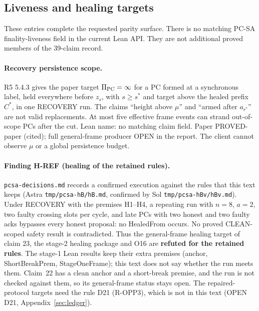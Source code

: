 \documentclass{article}
\newcommand{\nm}[1]{\nolinkurl{#1}}
\begin{document}
\subsection{Liveness and healing targets}

These entries complete the requested parity surface. There is no matching
PC-SA finality-liveness field in the current Lean API. They are not
additional proved members of the 39-claim record.

\paragraph{Recovery persistence scope.}
R5 5.4.3 gives the paper target $\Pi_{\rm PC}=\infty$ for a PC formed at
a synchronous label, held everywhere before $z_s$, with $s\geq s^*$ and
target above the healed prefix $C^*$, in one RECOVERY run.
The claims ``height above $\mu$'' and ``armed after $a_{r^*}$'' are not
valid replacements. At most five effective frame events can strand
out-of-scope PCs after the cut. Lean name: no matching claim field.
Paper PROVED-paper (cited); full general-frame producer OPEN in the report.
The client cannot observe $\mu$ or a global persistence budget.

\paragraph{Finding H-REF (healing of the retained rules).}
\nm{pcsa-decisions.md} records a confirmed execution against the rules
that this text keeps (Astra \nm{tmp/pcsa-hB/hB.md}, confirmed by Sol
\nm{tmp/pcsa-hBv/hBv.md}).  Under RECOVERY with the premises H1--H4, a
repeating run with $n=8$, $a=2$, two faulty crossing slots per cycle, and
late PCs with two honest and two faulty acks bypasses every honest
proposal: no HealedFrom occurs.  No proved CLEAN-scoped safety result is
contradicted.  Thus the general-frame healing target of claim 23,
the stage-2 healing package and O16 are \textbf{refuted for the retained
rules}.  The stage-1 Lean results keep their extra premises (anchor,
ShortBreakPrem, StageOneFrame); this text does not say whether the run meets
them.  Claim~22 has a clean anchor and a short-break premise, and the run
is not checked against them, so its general-frame status stays open.  The repaired-protocol targets need the rule D21 (R-OPP3), which is
not in this text (OPEN D21, Appendix~\ref{sec:ledger}).
\end{document}
